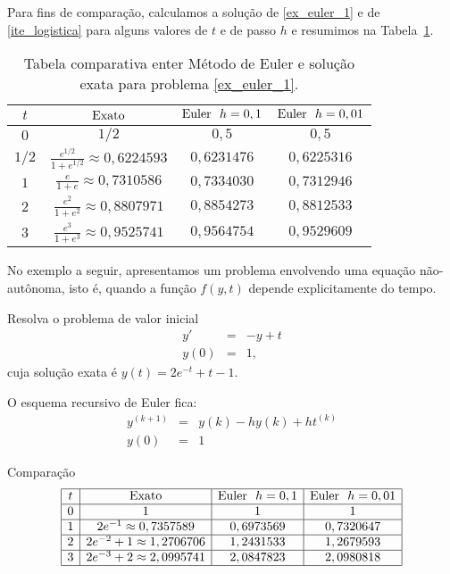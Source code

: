 Para fins de comparação, calculamos a solução de \ref{ex_euler_1} e de \eqref{ite_logistica} para alguns valores de $t$ e de passo $h$ e resumimos na Tabela~\ref{tab:log}.

\begin{table}
  \caption{Tabela comparativa enter Método de Euler e solução exata para problema \ref{ex_euler_1}.}
  \label{tab:log}
  \begin{tabular}{|c|c|c|c|}\hline
    $t$ & $\hbox{Exato}$ & $\hbox{Euler}~~ h=0,1$ & $\hbox{Euler}~~ h=0,01$\\\hline
    $0$ & $1/2$ & $0,5$ & $0,5$\\\hline
    $1/2$ & $\frac{e^{1/2}}{1+e^{1/2}}\approx 0,6224593$ & $0,6231476$ & $0,6225316$\\\hline
    $1$ & $\frac{e}{1+e}\approx 0,7310586$ & $0,7334030$ & $0,7312946$\\\hline
    $2$ & $\frac{e^2}{1+e^2}\approx  0,8807971$ & $0,8854273$  & $0,8812533$ \\\hline
    $3$ & $\frac{e^3}{1+e^3}\approx   0,9525741$  & $0,9564754$ & $0,9529609$ \\\hline
  \end{tabular}
\end{table}


No exemplo a seguir, apresentamos um problema envolvendo uma equação não-autônoma, isto é, quando a função $f(y,t)$ depende explicitamente do tempo.

\begin{ex} Resolva o problema de valor inicial
  \begin{eqnarray*}
    y'&=&-y+t\\
    y(0)&=&1,
  \end{eqnarray*}
cuja solução exata é $y(t)=2e^{-t}+t-1$.
\end{ex}
O esquema recursivo de Euler fica:
\begin{eqnarray*}
  y^{(k+1)}&=&y({k})- hy({k})+ht^{(k)}\\
  y(0)&=&1
\end{eqnarray*}

Comparação
\begin{equation*}
\begin{array}{|c|c|c|c|}\hline
t &  \hbox{Exato} & \hbox{Euler}~~ h=0,1 & \hbox{Euler}~~ h=0,01\\\hline
0 &  1 & 1 & 1\\\hline
1 &   2e^{-1}\approx 0,7357589 & 0,6973569   &   0,7320647  \\\hline
2 &   2e^{-2}+1\approx  1,2706706 &  1,2431533    &   1,2679593     \\\hline
3 &   2e^{-3}+2\approx 2,0995741  &  2,0847823 & 2,0980818   \\\hline
\end{array}  
\end{equation*}

